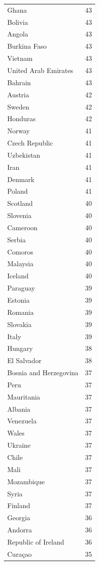 \begin{tabular}{ll}
Ghana & 43 \\
Bolivia & 43 \\
Angola & 43 \\
Burkina Faso & 43 \\
Vietnam & 43 \\
United Arab Emirates & 43 \\
Bahrain & 43 \\
Austria & 42 \\
Sweden & 42 \\
Honduras & 42 \\
Norway & 41 \\
Czech Republic & 41 \\
Uzbekistan & 41 \\
Iran & 41 \\
Denmark & 41 \\
Poland & 41 \\
Scotland & 40 \\
Slovenia & 40 \\
Cameroon & 40 \\
Serbia & 40 \\
Comoros & 40 \\
Malaysia & 40 \\
Iceland & 40 \\
Paraguay & 39 \\
Estonia & 39 \\
Romania & 39 \\
Slovakia & 39 \\
Italy & 39 \\
Hungary & 38 \\
El Salvador & 38 \\
Bosnia and Herzegovina & 37 \\
Peru & 37 \\
Mauritania & 37 \\
Albania & 37 \\
Venezuela & 37 \\
Wales & 37 \\
Ukraine & 37 \\
Chile & 37 \\
Mali & 37 \\
Mozambique & 37 \\
Syria & 37 \\
Finland & 37 \\
Georgia & 36 \\
Andorra & 36 \\
Republic of Ireland & 36 \\
Curaçao & 35 \\

\end{tabular}
